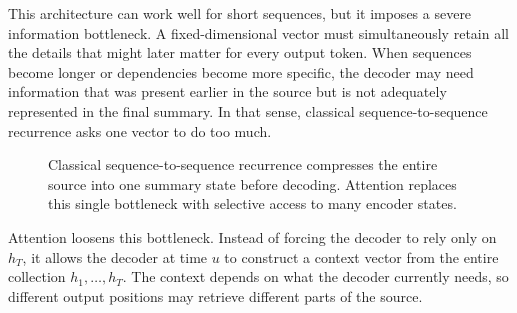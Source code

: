 \medskip

This architecture can work well for short sequences, but it imposes a severe information bottleneck.
A fixed-dimensional vector must simultaneously retain all the details that might later matter for every output token.
When sequences become longer or dependencies become more specific, the decoder may need information that was present earlier in the source but is not adequately represented in the final summary.
In that sense, classical sequence-to-sequence recurrence asks one vector to do too much.

\begin{figure}[t]
\centering
{}
\caption{Classical sequence-to-sequence recurrence compresses the entire source into one summary state before decoding. Attention replaces this single bottleneck with selective access to many encoder states.}
\label{fig:seq2seq-bottleneck}
\end{figure}

Attention loosens this bottleneck.
Instead of forcing the decoder to rely only on $h_T$, it allows the decoder at time $u$ to construct a context vector from the entire collection $h_1,\dots,h_T$.
The context depends on what the decoder currently needs, so different output positions may retrieve different parts of the source.

